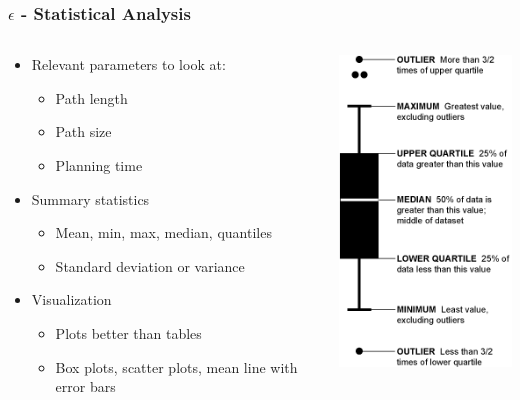 \documentclass{beamer}
\begin{document}
\begin{frame}
  \frametitle{$\epsilon$ - Statistical Analysis}
  \begin{columns}
    \begin{column}{0.5\textwidth}
      \begin{itemize}
      \item Relevant parameters to look at:
        \begin{itemize}
        \item Path length
        \item Path size
        \item Planning time
        \end{itemize}
      \item Summary statistics
        \begin{itemize}
        \item Mean, min, max, median, quantiles
        \item Standard deviation or variance
        \end{itemize}
      \item Visualization
        \begin{itemize}
        \item Plots better than tables
          \item Box plots, scatter plots, mean line with error bars
        \end{itemize}
      \end{itemize}
    \end{column}
    \begin{column}{0.5\textwidth}
      \begin{center}
        \includegraphics[scale=0.5]{./boxplot} \footnotemark
      \end{center}
    \end{column}
  \end{columns}
\end{frame}
\end{document}
